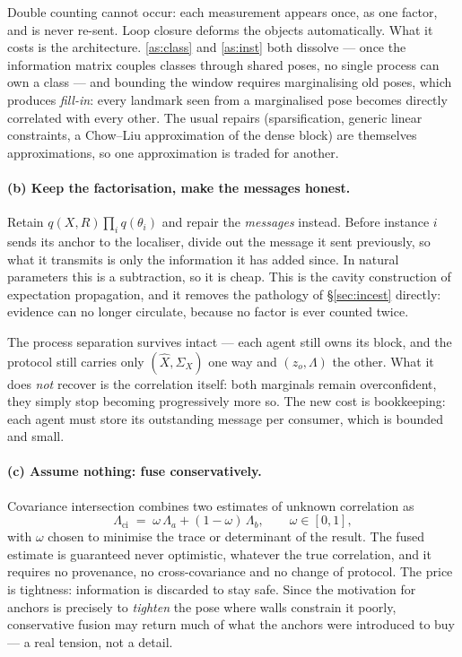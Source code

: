 \documentclass[11pt,a4paper]{report}
\theoremstyle{definition}   %
\begin{document}
Double counting cannot occur: each measurement appears once, as one factor, and is never re-sent.
Loop closure deforms the objects automatically. What it costs is the architecture. \ref{as:class}
and \ref{as:inst} both dissolve --- once the information matrix couples classes through shared
poses, no single process can own a class --- and bounding the window requires marginalising old
poses, which produces \emph{fill-in}: every landmark seen from a marginalised pose becomes directly
correlated with every other. The usual repairs (sparsification, generic linear constraints, a
Chow--Liu approximation of the dense block) are themselves approximations, so one approximation is
traded for another.

\paragraph{(b) Keep the factorisation, make the messages honest.} Retain
$q(X,R)\prod_i q(\theta_i)$ and repair the \emph{messages} instead. Before instance $i$ sends its
anchor to the localiser, divide out the message it sent previously, so what it transmits is only
the information it has added since. In natural parameters this is a subtraction, so it is cheap.
This is the cavity construction of expectation propagation, and it removes the pathology of
\S\ref{sec:incest} directly: evidence can no longer circulate, because no factor is ever counted
twice.

The process separation survives intact --- each agent still owns its block, and the protocol still
carries only $(\hat X,\Sigma_X)$ one way and $(z_o,\Lambda)$ the other. What it does \emph{not}
recover is the correlation itself: both marginals remain overconfident, they simply stop becoming
progressively more so. The new cost is bookkeeping: each agent must store its outstanding message
per consumer, which is bounded and small.

\paragraph{(c) Assume nothing: fuse conservatively.} Covariance intersection combines two estimates
of unknown correlation as
\begin{equation}
\Lambda_{\text{ci}}\;=\;\omega\,\Lambda_a+(1-\omega)\,\Lambda_b,
\qquad \omega\in[0,1],
\end{equation}
with $\omega$ chosen to minimise the trace or determinant of the result. The fused estimate is
guaranteed never optimistic, whatever the true correlation, and it requires no provenance, no
cross-covariance and no change of protocol. The price is tightness: information is discarded to
stay safe. Since the motivation for anchors is precisely to \emph{tighten} the pose where walls
constrain it poorly, conservative fusion may return much of what the anchors were introduced to
buy --- a real tension, not a detail.
\end{document}
